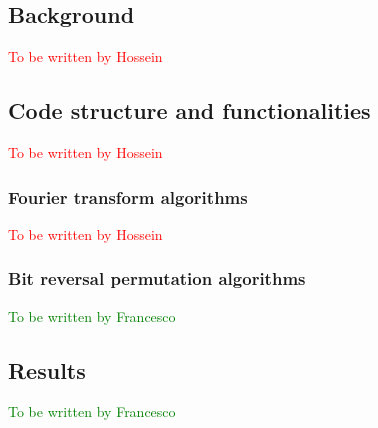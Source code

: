 \subsection{Background}
\textcolor{red}{To be written by Hossein}

\subsection{Code structure and functionalities}
\textcolor{red}{To be written by Hossein}

\subsubsection{Fourier transform algorithms}
\textcolor{red}{To be written by Hossein}

\subsubsection{Bit reversal permutation algorithms}
\textcolor{green}{To be written by Francesco}

\subsection{Results}
\textcolor{green}{To be written by Francesco}